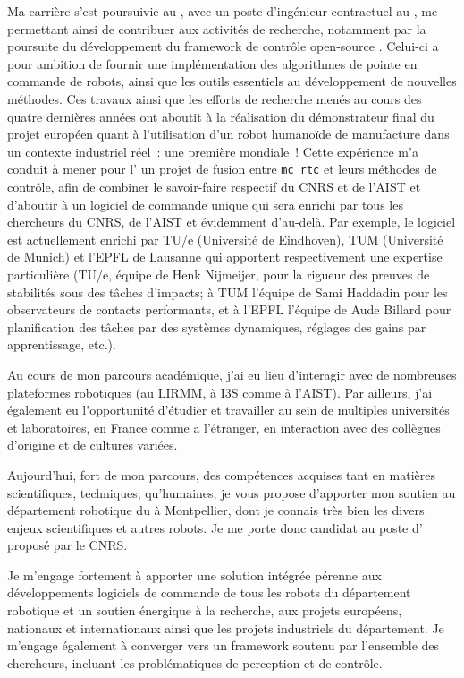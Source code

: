 \documentclass[11pt, a4paper]{awesome-cv}
\begin{document}
\begin{cvletter}
  Ma carrière s'est poursuivie au , avec un poste d'ingénieur contractuel au
  , me permettant ainsi de contribuer aux activités de recherche, notamment par la
  poursuite du développement du framework de contrôle open-source . Celui-ci a
  pour ambition de fournir une implémentation des algorithmes de pointe en commande de robots, ainsi que les
  outils essentiels au développement de nouvelles méthodes. Ces travaux ainsi que les efforts de recherche
  menés au cours des quatre dernières années ont aboutit à la réalisation du démonstrateur final du projet
  européen  quant à l'utilisation d'un robot humanoïde de manufacture dans
  un contexte industriel réel~: une première mondiale~! Cette expérience m'a conduit à mener pour
  l' un projet de fusion entre {\tt mc\_rtc} et leurs méthodes de contrôle, afin de
  combiner le savoir-faire respectif du CNRS et de l'AIST et d'aboutir à un logiciel de commande unique qui
  sera enrichi par tous les chercheurs du CNRS, de l'AIST et évidemment d'au-delà. Par exemple, le logiciel
  est actuellement enrichi par TU/e (Université de Eindhoven), TUM (Université de Munich) et l'EPFL de
  Lausanne qui apportent respectivement une expertise particulière (TU/e, équipe de Henk Nijmeijer, pour la
    rigueur des preuves de stabilités sous des tâches d'impacts; à TUM l'équipe de Sami Haddadin pour les
    observateurs de contacts performants, et à l'EPFL l'équipe de Aude Billard pour planification des tâches
  par des systèmes dynamiques, réglages des gains par apprentissage, etc.).

  Au cours de mon parcours académique, j'ai eu lieu d'interagir avec de nombreuses plateformes robotiques (au
  LIRMM, à I3S comme à l'AIST). Par ailleurs, j'ai également eu l'opportunité d'étudier et travailler au sein
  de multiples universités et laboratoires, en France comme a l'étranger, en interaction avec des collègues
  d'origine et de cultures variées.

  Aujourd'hui, fort de mon parcours, des compétences acquises tant en matières scientifiques, techniques,
  qu'humaines, je vous propose d'apporter mon soutien au département robotique du 
  à Montpellier, dont je connais très bien les divers enjeux scientifiques et autres robots. Je me porte donc
  candidat au poste d' proposé par le CNRS.

  Je m'engage fortement à apporter une solution intégrée pérenne aux développements logiciels de commande de
  tous les robots du département robotique et un soutien énergique à la recherche, aux projets européens,
  nationaux et internationaux ainsi que les projets industriels du département. Je m'engage également à
  converger vers un framework soutenu par l'ensemble des chercheurs, incluant les problématiques de
  perception et de contrôle.

\end{cvletter}

\makeletterclosing
\end{document}
